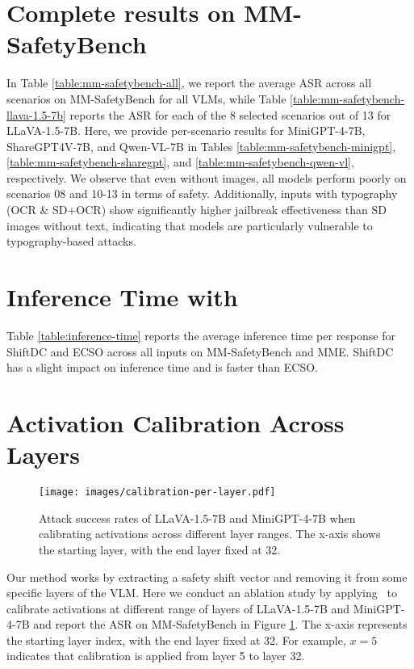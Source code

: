 \section{Complete results on MM-SafetyBench} \label{appendix-results}






In Table \ref{table:mm-safetybench-all}, we report the average ASR across all scenarios on MM-SafetyBench for all VLMs, while Table \ref{table:mm-safetybench-llava-1.5-7b} reports the ASR for each of the 8 selected scenarios out of 13 for LLaVA-1.5-7B. Here, we provide per-scenario results for MiniGPT-4-7B, ShareGPT4V-7B, and Qwen-VL-7B in Tables \ref{table:mm-safetybench-minigpt}, \ref{table:mm-safetybench-sharegpt}, and \ref{table:mm-safetybench-qwen-vl}, respectively. We observe that even without images, all models perform poorly on scenarios 08 and 10-13 in terms of safety. Additionally, inputs with typography (OCR \& SD+OCR) show significantly higher jailbreak effectiveness than SD images without text, indicating that models are particularly vulnerable to typography-based attacks.

\section{Inference Time with \OursMethod}

Table \ref{table:inference-time} reports the average inference time per response for ShiftDC and ECSO across all inputs on MM-SafetyBench and MME. ShiftDC has a slight impact on inference time and is faster than ECSO.




\section{Activation Calibration Across Layers} \label{appendix-ablation}

\begin{figure}[t]
    \centering
    \texttt{[image: images/calibration-per-layer.pdf]}
    \caption{Attack success rates of LLaVA-1.5-7B and MiniGPT-4-7B when calibrating activations across different layer ranges. The x-axis shows the starting layer, with the end layer fixed at 32.}
    \label{fig:exp-per-layer}
\end{figure}

Our method works by extracting a safety shift vector and removing it from some specific layers of the VLM. Here we conduct an ablation study by applying \OursMethod\ to calibrate activations at different range of layers of LLaVA-1.5-7B and MiniGPT-4-7B and report the ASR on MM-SafetyBench in Figure \ref{fig:exp-per-layer}. The x-axis represents the starting layer index, with the end layer fixed at 32. For example, $x=5$ indicates that calibration is applied from layer 5 to layer 32.

